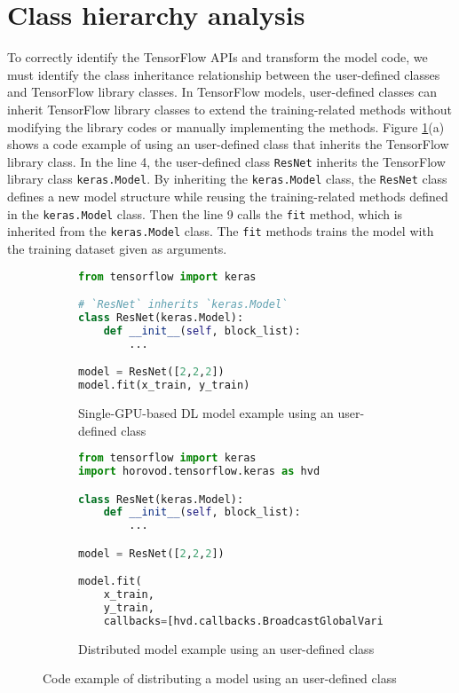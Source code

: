 \section{Class hierarchy analysis}\label{sec:cha}

To correctly identify the TensorFlow APIs and transform the model code,
we must identify the class inheritance relationship between the user-defined
classes and TensorFlow library classes.
In TensorFlow models, user-defined classes can inherit 
TensorFlow library classes to extend the training-related methods 
without modifying the library codes or manually implementing the methods.
Figure \ref{fig:cha:tfex}(a) shows a code example of using an user-defined class
that inherits the TensorFlow library class.
In the line 4, the user-defined class {\tt ResNet} inherits the TensorFlow
library class {\tt keras.Model}.
By inheriting the {\tt keras.Model} class, the {\tt ResNet} class
defines a new model structure while reusing the training-related methods 
defined in the {\tt keras.Model} class.
Then the line 9 calls the {\tt fit} method,
which is inherited from the {\tt keras.Model} class.
The {\tt fit} methods trains the model with the training dataset 
given as arguments.

\begin{figure}[!ht]
  \centering
  \begin{subfigure}[t]{0.35\textwidth}
    \begin{lstlisting}[language=Python]
from tensorflow import keras

# `ResNet` inherits `keras.Model`
class ResNet(keras.Model): 
    def __init__(self, block_list):
        ...

model = ResNet([2,2,2])
model.fit(x_train, y_train)\end{lstlisting}
    \caption{Single-GPU-based DL model example using an user-defined class}
  \end{subfigure}
  \hspace{3mm}
  \begin{subfigure}[t]{0.6\textwidth}
    \begin{lstlisting}[language=Python]
from tensorflow import keras
import horovod.tensorflow.keras as hvd

class ResNet(keras.Model):
    def __init__(self, block_list):
        ...

model = ResNet([2,2,2])

model.fit(
    x_train, 
    y_train,
    callbacks=[hvd.callbacks.BroadcastGlobalVariablesCallback(0)])\end{lstlisting}
    \caption{Distributed model example using an user-defined class}
  \end{subfigure}

  \caption{Code example of distributing a model using an user-defined class}
  \label{fig:cha:tfex}
\end{figure}

